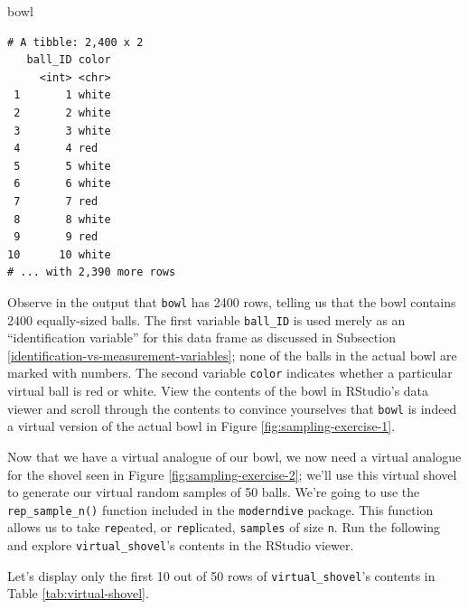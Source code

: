 \documentclass[12pt, krantz2,]{krantz}
\makeatletter
\newenvironment{Shaded}{\begin{snugshade}}{\end{snugshade}}
\newcommand{\DataTypeTok}[1]{\textcolor[rgb]{0.27,0.27,0.27}{#1}}
\newcommand{\DecValTok}[1]{\textcolor[rgb]{0.06,0.06,0.06}{#1}}
\newcommand{\KeywordTok}[1]{\textcolor[rgb]{0.27,0.27,0.27}{\textbf{#1}}}
\newcommand{\NormalTok}[1]{#1}
\newcommand{\OperatorTok}[1]{\textcolor[rgb]{0.43,0.43,0.43}{\textbf{#1}}}
\newcommand{\StringTok}[1]{\textcolor[rgb]{0.5,0.5,0.5}{#1}}
\newenvironment{kframe}{%
\medskip{}
\setlength{\fboxsep}{.8em}
 \def\at@end@of@kframe{}%
 \ifinner\ifhmode%
  \def\at@end@of@kframe{\end{minipage}}%
  \begin{minipage}{\columnwidth}%
 \fi\fi%
 \def\FrameCommand##1{\hskip\@totalleftmargin \hskip-\fboxsep
 \colorbox{shadecolor}{##1}\hskip-\fboxsep
     \hskip-\linewidth \hskip-\@totalleftmargin \hskip\columnwidth}%
 \MakeFramed {\advance\hsize-\width
   \@totalleftmargin\z@ \linewidth\hsize
   \@setminipage}}%
 {\par\unskip\endMakeFramed%
 \at@end@of@kframe}
\renewenvironment{Shaded}{\begin{kframe}}{\end{kframe}}
\makeatother
\begin{document}
\begin{Shaded}
\begin{Highlighting}[]
\NormalTok{bowl}
\end{Highlighting}
\end{Shaded}

\begin{verbatim}
# A tibble: 2,400 x 2
   ball_ID color
     <int> <chr>
 1       1 white
 2       2 white
 3       3 white
 4       4 red  
 5       5 white
 6       6 white
 7       7 red  
 8       8 white
 9       9 red  
10      10 white
# ... with 2,390 more rows
\end{verbatim}

Observe in the output that \texttt{bowl} has 2400 rows, telling us that the bowl contains 2400 equally-sized balls. The first variable \texttt{ball\_ID} is used merely as an ``identification variable'' for this data frame as discussed in Subsection \ref{identification-vs-measurement-variables}; none of the balls in the actual bowl are marked with numbers. The second variable \texttt{color} indicates whether a particular virtual ball is red or white. View the contents of the bowl in RStudio's data viewer and scroll through the contents to convince yourselves that \texttt{bowl} is indeed a virtual version of the actual bowl in Figure \ref{fig:sampling-exercise-1}.

Now that we have a virtual analogue of our bowl, we now need a virtual analogue for the shovel seen in Figure \ref{fig:sampling-exercise-2}; we'll use this virtual shovel to generate our virtual random samples of 50 balls. We're going to use the \texttt{rep\_sample\_n()} function included in the \texttt{moderndive} package. This function allows us to take \texttt{rep}eated, or \texttt{rep}licated, \texttt{samples} of size \texttt{n}. Run the following and explore \texttt{virtual\_shovel}'s contents in the RStudio viewer.

\begin{Shaded}
\end{Shaded}

Let's display only the first 10 out of 50 rows of \texttt{virtual\_shovel}'s contents in Table \ref{tab:virtual-shovel}.
\end{document}
